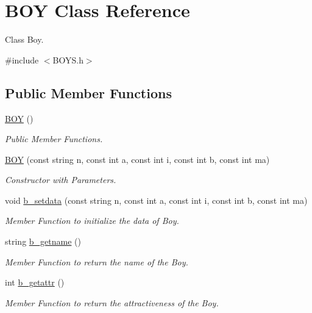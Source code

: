 \hypertarget{class_b_o_y}{}\section{B\+OY Class Reference}
\label{class_b_o_y}


Class Boy.  




{\ttfamily \#include $<$B\+O\+Y\+S.\+h$>$}

\subsection*{Public Member Functions}
\begin{DoxyCompactItemize}
\item 
\hyperlink{class_b_o_y_ac91c821a01f28ed38f374951c586b29b}{B\+OY} ()
\begin{DoxyCompactList}\small\item\em Public Member Functions. \end{DoxyCompactList}\item 
\hyperlink{class_b_o_y_adef7f2ff9935938ad36a7bc801126eff}{B\+OY} (const string n, const int a, const int i, const int b, const int ma)
\begin{DoxyCompactList}\small\item\em Constructor with Parameters. \end{DoxyCompactList}\item 
void \hyperlink{class_b_o_y_a1f1f8342be4bedc55ac72e2af0e13bce}{b\+\_\+setdata} (const string n, const int a, const int i, const int b, const int ma)
\begin{DoxyCompactList}\small\item\em Member Function to initialize the data of Boy. \end{DoxyCompactList}\item 
string \hyperlink{class_b_o_y_a789052488ba219f52d427241268b3a98}{b\+\_\+getname} ()
\begin{DoxyCompactList}\small\item\em Member Function to return the name of the Boy. \end{DoxyCompactList}\item 
int \hyperlink{class_b_o_y_a711c3c4753c474b002d2b0d01d3a4ea3}{b\+\_\+getattr} ()
\begin{DoxyCompactList}\small\item\em Member Function to return the attractiveness of the Boy. \end{DoxyCompactList}\item 

\end{DoxyCompactItemize}
